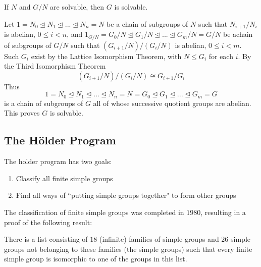 \documentclass[12pt, a4paper, twoside, openright, titlepage]{book}
\begin{document}
\begin{prop}{}{}
    If $N$ and $G/N$ are solvable, then $G$ is solvable.
\end{prop}
\begin{proof*}{}{}
    Let $1 = N_0 \trianglelefteq N_1 \trianglelefteq ... \trianglelefteq N_n = N$ be a chain of subgroups of $N$ such that $N_{i+1}/N_i$ is abelian, $0 \leq i < n$, and $1_{G/N} = G_0/N\trianglelefteq G_1/N\trianglelefteq ... \trianglelefteq G_m/N = G/N$ be achain of subgroups of $G/N$ such that $(G_{i+1}/N)/(G_i/N)$ is abelian, $0 \leq i < m$. Such $G_i$ exist by the Lattice Isomorphism Theorem, with $N \leq G_i$ for each $i$. By the Third Isomorphism Theorem \begin{equation*}
        (G_{i+1}/N)/(G_i/N) \cong G_{i+1}/G_i
    \end{equation*}
    Thus \begin{equation*}
        1 = N_0 \trianglelefteq N_1 \trianglelefteq ... \trianglelefteq N_n = N = G_0 \trianglelefteq G_1 \trianglelefteq ... \trianglelefteq G_m = G
    \end{equation*}
    is a chain of subgroups of $G$ all of whose successive quotient groups are abelian. This proves $G$ is solvable.
\end{proof*}





\subsection{The H\"{o}lder Program}

The holder program has two goals: \begin{enumerate}
    \item Classify all finite simple groups
    \item Find all ways of ``putting simple groups together" to form other groups
\end{enumerate}

The classification of finite simple groups was completed in $1980$, resulting in a proof of the following result:

\begin{thm}{}{}
    There is a list consisting of $18$ (infinite) families of simple groups and $26$ simple groups not belonging to these families (the  simple groups) such that every finite simple group is isomorphic to one of the groups in this list.
\end{thm}
\end{document}
